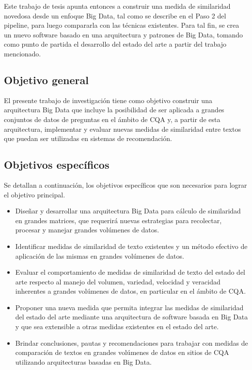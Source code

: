 \bigskip Este trabajo de tesis apunta entonces a construir una medida de similaridad novedosa desde un enfoque Big Data, tal como se describe en el Paso 2 del pipeline, para luego compararla con las técnicas existentes. Para tal fin, se crea un nuevo software basado en una arquitectura y patrones de Big Data, tomando como punto de partida el desarrollo del estado del arte a partir del trabajo mencionado.

\subsection{Objetivo general}
El presente trabajo de investigación tiene como objetivo construir una arquitectura Big Data que incluye la posibilidad de ser aplicada a grandes conjuntos de datos de preguntas en el ámbito de CQA y, a partir de esta arquitectura, implementar y evaluar nuevas medidas de similaridad entre textos que puedan ser utilizadas en sistemas de recomendación.

\subsection{Objetivos específicos}
Se detallan a continuación, los objetivos específicos que son necesarios para lograr el objetivo principal.
\begin{itemize}
	\item Diseñar y desarrollar una arquitectura Big Data para cálculo de similaridad en grandes matrices, que requerirá nuevas estrategias para recolectar, procesar y manejar grandes volúmenes de datos.
	\item Identificar medidas de similaridad de texto existentes y un método efectivo de aplicación de las mismas en grandes volúmenes de datos.
	\item Evaluar el comportamiento de medidas de similaridad de texto del estado del arte respecto al manejo del volumen, variedad, velocidad y veracidad inherentes a grandes volúmenes de datos, en particular en el ámbito de CQA.
	\item Proponer una nueva medida que permita integrar las medidas de similaridad del estado del arte mediante una arquitectura de software basada en Big Data y que sea extensible a otras medidas existentes en el estado del arte.
	\item Brindar conclusiones, pautas y recomendaciones para trabajar con medidas de comparación de textos en grandes volúmenes de datos en sitios de CQA utilizando arquitecturas basadas en Big Data.
\end{itemize}